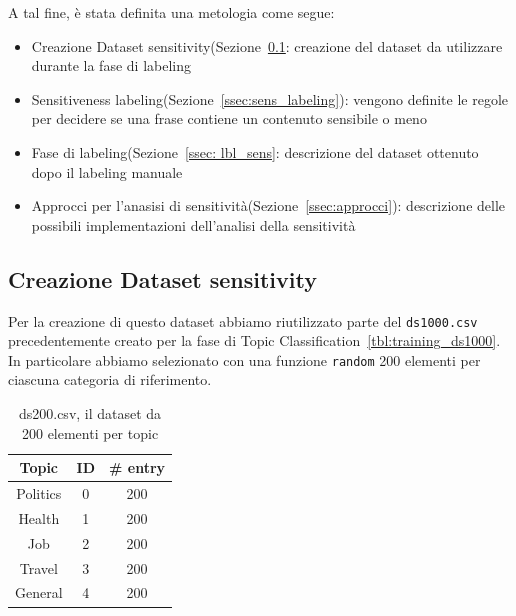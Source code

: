 A tal fine, è stata definita una metologia come segue:
\begin{itemize}
    \item Creazione Dataset sensitivity(Sezione~\ref{ssec:create_sens_ds}: creazione del dataset da utilizzare durante la fase di labeling
    \item Sensitiveness labeling(Sezione~\ref{ssec:sens_labeling}): vengono definite le regole per decidere se una frase contiene un contenuto sensibile o meno
    \item Fase di labeling(Sezione~\ref{ssec: lbl_sens}: descrizione del dataset ottenuto dopo il labeling manuale
    \item Approcci per l'anasisi di sensitività(Sezione~\ref{ssec:approcci}): descrizione delle possibili implementazioni dell'analisi della sensitività
\end{itemize}

\subsection{Creazione Dataset sensitivity}
\label{ssec:create_sens_ds}
Per la creazione di questo dataset abbiamo riutilizzato parte del {\tt ds1000.csv} precedentemente creato per la fase di Topic Classification~\ref{tbl:training_ds1000}. In particolare abbiamo selezionato con una funzione {\tt random} 200 elementi per ciascuna categoria di riferimento.

\begin{table}[h!t]
    \centering
    \begin{tabular}{c|c|c}
    \hline
        \textbf{Topic} & \textbf{ID} & \textbf{\# entry} \\ \hline
        Politics & 0 & 200 \\ \hline
        Health & 1 & 200 \\ \hline
        Job & 2 & 200 \\ \hline
        Travel & 3 & 200 \\ \hline
        General & 4 & 200 \\ \hline
    \end{tabular}
    \caption{ds200.csv, il dataset da 200 elementi per topic}
    \label{tab:ds200.csv}
\end{table}
\FloatBarrier

